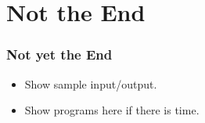 \documentclass[12]{beamer}
\begin{document}



\section{Not the End}
\begin{frame}
\frametitle{Not yet the End}
\begin{itemize}
\item<1-> Show sample input/output.
\item<1-> Show programs here if there is time.
\end{itemize}
\end{frame}
\end{document}
